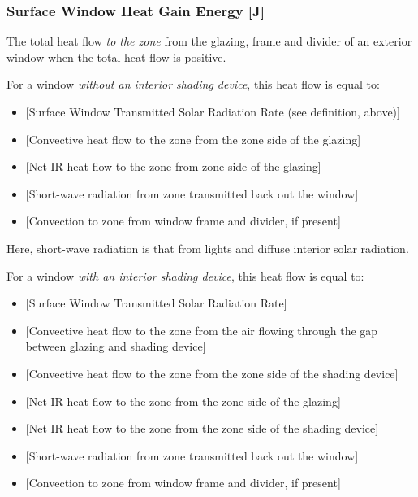 \subsubsection{Surface Window Heat Gain Energy {[}J{]}}\label{surface-window-heat-gain-energy-j}

The total heat flow \emph{to the zone} from the glazing, frame and divider of an exterior window when the total heat flow is positive.

For a window \emph{without an interior shading device}, this heat flow is equal to:

\begin{itemize}
\item
  {[}Surface Window Transmitted Solar Radiation Rate (see definition, above){]}
\item
  {[}Convective heat flow to the zone from the zone side of the glazing{]}
\item
  {[}Net IR heat flow to the zone from zone side of the glazing{]}
\item
  {[}Short-wave radiation from zone transmitted back out the window{]}
\item
  {[}Convection to zone from window frame and divider, if present{]}
\end{itemize}

Here, short-wave radiation is that from lights and diffuse interior solar radiation.

For a window \emph{with an interior shading device}, this heat flow is equal to:


\begin{itemize}
\item
  {[}Surface Window Transmitted Solar Radiation Rate{]}
\item
  {[}Convective heat flow to the zone from the air flowing through the gap between glazing and shading device{]}
\item
  {[}Convective heat flow to the zone from the zone side of the shading device{]}
\item
  {[}Net IR heat flow to the zone from the zone side of the glazing{]}
\item
  {[}Net IR heat flow to the zone from the zone side of the shading device{]}
\item
  {[}Short-wave radiation from zone transmitted back out the window{]}
\item
  {[}Convection to zone from window frame and divider, if present{]}
\end{itemize}

